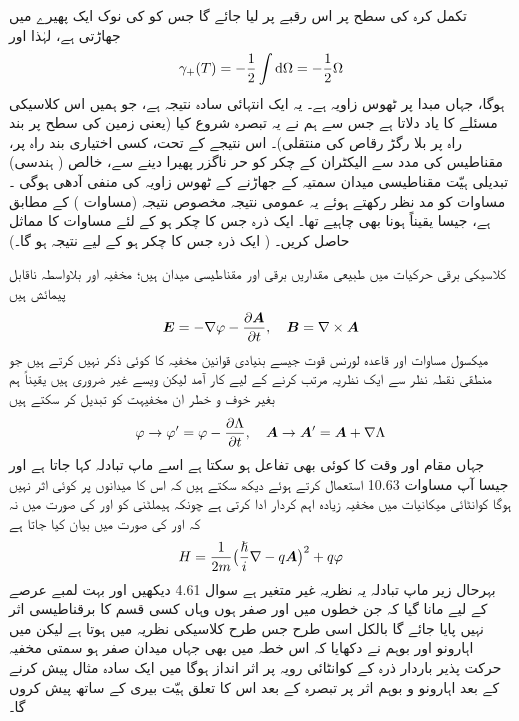تکمل کرہ کی سطح پر اس رقبے پر لیا جائے گا جس کو  کی  نوک  ایک پھیرے  میں  جھاڑتی  ہے،   لہٰذا   اور 
\begin{align}\label{مساوات_حر_عمومی_نتیجہ}
\gamma_{+} (T) = - \frac{1}{2} \int \dif \Omega = - \frac{1}{2} \Omega
\end{align}
ہوگا، جہاں مبدا  پر ٹھوس زاویہ  ہے۔  یہ ایک انتہائی سادہ نتیجہ ہے،  جو ہمیں اس کلاسیکی مسئلے  کا یاد دلاتا ہے جس سے ہم نے یہ تبصرہ شروع کیا  (یعنی زمین کی سطح پر  بند راہ پر   بلا رگڑ   رقاص   کی منتقلی)۔  اس نتیجے کے تحت،  کسی اختیاری بند راہ پر،   مقناطیس کی مدد سے الیکٹران کے چکر کو حر ناگزر  پھیرا دینے سے،  خالص ( ہندسی) تبدیلی ہیّت مقناطیسی میدان سمتیہ کے جھاڑنے کے  ٹھوس زاویہ کی منفی آدھی   ہوگی ۔  مساوات    کو مد نظر رکھتے ہوئے یہ عمومی نتیجہ   مخصوص نتیجہ   (مساوات )   کے مطابق ہے،  جیسا یقیناً ہونا بھی چاہیے  تھا۔
ایک ذرہ جس کا چکر    ہو کے لئے مساوات    کا مماثل حاصل کریں۔    ( ایک ذرہ جس کا چکر  ہو کے لیے نتیجہ   ہو گا۔)



کلاسیکی برقی حرکیات میں طبیعی مقداریں برقی اور مقناطیسی میدان ہیں؛ مخفیہ  اور  بلاواسطہ ناقابل پیمائش ہیں 
\begin{align}
{\ensuremath{{\boldsymbol{E}}}} = - \nabla \varphi - \frac{\partial {\ensuremath{{\boldsymbol{A}}}}}{\partial t}, \quad {\ensuremath{{\boldsymbol{B}}}} = \nabla \times {\ensuremath{{\boldsymbol{A}}}}
\end{align}
میکسول مساوات اور قاعدہ لورنس قوت جیسے بنیادی قوانین مخفیہ کا کوئی ذکر نہیں کرتے ہیں جو منطقی نقطہ نظر سے ایک نظریہ  مرتب کرنے  کے لیے کار آمد لیکن ویسے غیر ضروری ہیں یقیناً ہم بغیر  خوف  و خطر ان مخفیہت کو تبدیل کر سکتے ہیں 
\begin{align}
\varphi \to \varphi' = \varphi - \frac{\partial \Lambda}{\partial t}, \quad {\ensuremath{{\boldsymbol{A}}}} \to {\ensuremath{{\boldsymbol{A}}}}' = {{\boldsymbol{A}}} + \nabla \Lambda
\end{align}
جہاں  مقام اور وقت کا کوئی بھی تفاعل ہو سکتا ہے اسے ماپ تبادلہ کہا جاتا ہے اور جیسا آپ مساوات 10.63 استعمال کرتے ہوئے دیکھ سکتے ہیں کہ اس کا میدانوں پر کوئی اثر نہیں ہوگا کوانٹائی میکانیات میں مخفیہ زیادہ اہم کردار ادا کرتی ہے چونکہ ہیملٹنی کو  اور  کی صورت میں نہ کہ  اور  کی صورت میں بیان کیا جاتا ہے 
\begin{align}
H = \frac{1}{2m} \big ( \frac{\hslash}{i} \nabla - q {{\boldsymbol{A}}} \big )^2 + q \varphi
\end{align}
بہرحال  زیر ماپ تبادلہ یہ نظریہ  غیر متغیر ہے سوال 4.61 دیکھیں اور بہت لمبے  عرصے  کے لیے مانا گیا کہ  جن خطوں میں   اور  صفر ہوں وہاں کسی قسم کا برقناطیسی اثر نہیں پایا جائے گا بالکل اسی طرح جس طرح کلاسیکی نظریہ میں ہوتا ہے لیکن  میں اہارونو اور بوہم نے دکھایا کہ اس خطہ میں بھی جہاں میدان صفر ہو سمتی مخفیہ حرکت پذیر باردار ذرہ کے کوانٹائی رویہ پر اثر انداز ہوگا میں ایک سادہ مثال پیش کرنے کے بعد اہارونو و بوہم   اثر پر تبصرہ کے بعد اس کا تعلق ہیّت بیری کے ساتھ پیش کروں گا۔


